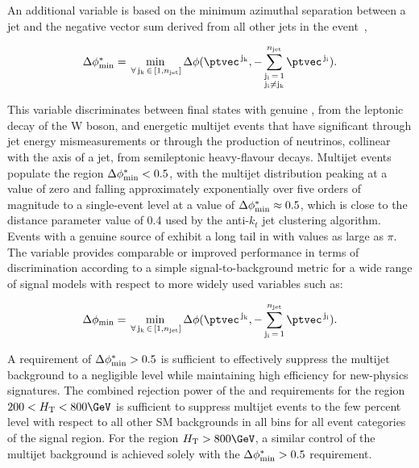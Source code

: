 An additional variable is based on the minimum azimuthal separation
between a jet and the negative vector \ptvec sum derived from all
other jets in the event~\cite{RA1Paper},


\begin{equation}
  \bdphi = \min_{\,\forall\, \mathrm{j_k} \,\in\, [1,\njet]}
  \Delta\phi( \ptvec^{\,\mathrm{j_k}}, 
  -\sum_{\substack{\mathrm{j_i}\, =\, 1 \\ \mathrm{j_i} \ne \mathrm{j_k}}}^{\njet}
  \ptvec^{\,\mathrm{j_i}}).   
  \label{eq:bdphi}
\end{equation}

This variable discriminates between final states with genuine
\ptvecmiss, \eg from the leptonic decay of the W boson, and energetic
multijet events that have significant \ptvecmiss through jet energy
mismeasurements or through the production of neutrinos, collinear with
the axis of a jet, from semileptonic heavy-flavour decays. Multijet
events populate the region $\mbox{$\Delta\phi^{*}_{\rm min}$} < 0.5$, with the multijet
distribution peaking at a value of zero and falling approximately
exponentially over five orders of magnitude to a single-event level at
a value of $\mbox{$\Delta\phi^{*}_{\rm min}$} \approx 0.5$, which is close to the distance
parameter value of 0.4 used by the anti-$k_t$ jet clustering
algorithm. Events with a genuine source of \ptvecmiss exhibit a long
tail in \bdphi with values as large as $\pi$. The \bdphi variable
provides comparable or improved performance in terms of discrimination
according to a simple signal-to-background metric for a wide range of
signal models with respect to more widely used variables such as:

\begin{equation}
  \Delta\phi_\text{min} = \min_{\,\forall\, \mathrm{j_k} \,\in\, [1,\njet]}
  \Delta\phi(\ptvec^{\,\mathrm{j_k}}, -\sum_{\mathrm{j_i}\, =\, 1}^{\njet}
  \ptvec^{\,\mathrm{j_i}}).
  \label{eq:dphi}
\end{equation}


A requirement of $\mbox{$\Delta\phi^{*}_{\rm min}$} > 0.5$ is sufficient to effectively suppress
the multijet background to a negligible level while maintaining high
efficiency for new-physics signatures. The combined rejection power of
the \alphat and \bdphi requirements for the region $200 < \scalht <
800\GeV$ is sufficient to suppress multijet events to the few percent
level with respect to all other SM backgrounds in all \scalht bins for
all event categories of the signal region. For the region $\scalht >
800\GeV$, a similar control of the multijet background is achieved
solely with the $\mbox{$\Delta\phi^{*}_{\rm min}$} > 0.5$ requirement.

